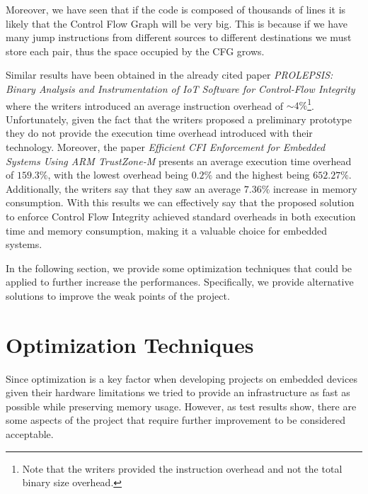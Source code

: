 Moreover, we have seen that if the code is composed of thousands of lines it is likely
that the Control Flow Graph will be very big. This is because if we have many
jump instructions from different sources to different destinations we must store
each pair, thus the space occupied by the CFG grows.

Similar results have been obtained in the already cited paper \textit{PROLEPSIS:
Binary Analysis and Instrumentation of IoT Software for Control-Flow Integrity}\cite{article2}
where the writers introduced an average instruction overhead of $\sim 4\%$\footnote{Note
that the writers provided the instruction overhead and not the total binary size
overhead.}. Unfortunately, given the fact that the writers proposed a
preliminary prototype they do not provide the execution time overhead introduced
with their technology. Moreover, the paper \textit{Efficient CFI Enforcement for
Embedded Systems Using ARM TrustZone-M}\cite{article1} presents an average
execution time overhead of $1 59.3 \%$, with the lowest overhead being $0.2 \%$ and
the highest being $652.2 7 \%$. Additionally, the writers say that they saw an average
$7.36\%$ increase in memory consumption. With this results we can effectively
say that the proposed solution to enforce Control Flow Integrity achieved
standard overheads in both execution time and memory consumption, making it a valuable
choice for embedded systems.

In the following section, we provide some optimization techniques that could be
applied to further increase the performances. Specifically, we provide
alternative solutions to improve the weak points of the project.

\section{Optimization Techniques}
\label{sec:pa_optimization}

Since optimization is a key factor when developing projects on embedded devices given
their hardware limitations we tried to provide an infrastructure as fast as possible
while preserving memory usage. However, as test results show, there are some
aspects of the project that require further improvement to be considered
acceptable.


